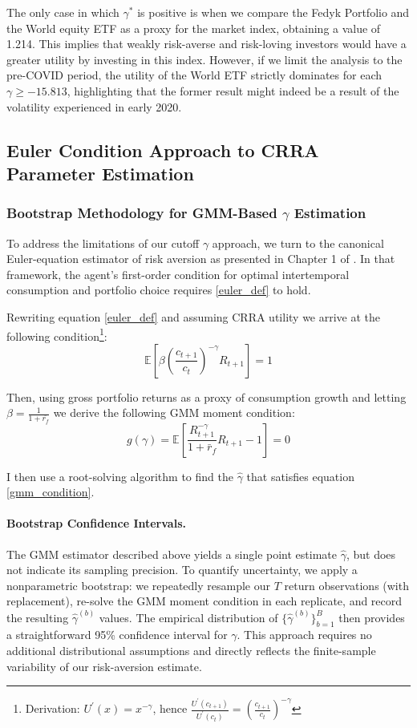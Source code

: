 The only case in which $\gamma^*$ is positive is when we compare the Fedyk Portfolio and the World equity ETF as a proxy for the market index, obtaining a value of 1.214.
This implies that weakly risk-averse and risk-loving investors would have a greater utility by investing in this index.
However, if we limit the analysis to the pre-COVID period, the utility of the World ETF strictly dominates for each $\gamma\geq-15.813$, 
highlighting that the former result might indeed be a result of the volatility experienced in early 2020.  

\subsection{Euler Condition Approach to CRRA Parameter Estimation}
\subsubsection{Bootstrap Methodology for GMM-Based $\gamma$ Estimation}
To address the limitations of our cutoff $\gamma$ approach, we turn to the canonical Euler-equation estimator of risk aversion as presented in Chapter 1 of \cite{Cochrane2005}.  
In that framework, the agent's first-order condition for optimal intertemporal consumption and portfolio choice requires \ref{euler_def} to hold.

Rewriting equation \ref{euler_def} and assuming CRRA utility we arrive at the following condition\footnote{Derivation:
$U^\prime(x)=x^{-\gamma}$, hence $\frac{U^\prime(c_{t+1})}{U^\prime(c_{t})}=\left(\frac{c_{t+1}}{c_t}\right)^{-\gamma}$}:
\begin{equation}
    \mathbb{E}\left[ \beta \left( \frac{c_{t+1}}{c_{t}} \right)^{-\gamma} R_{t+1} \right] = 1
\end{equation}  

Then, using gross portfolio returns as a proxy of consumption growth and letting $\beta = \frac{1}{1+\bar{r_f}}$ we derive the following GMM moment condition:
\begin{equation}
    g(\gamma) = \mathbb{E} \left[ \frac{R_{t+1}^{-\gamma}}{1+\bar{r}_f}  R_{t+1} - 1\right] = 0
    \label{gmm_condition}
\end{equation}  

I then use a root-solving algorithm to find the $\hat\gamma$ that satisfies equation \ref{gmm_condition}. 

\paragraph{Bootstrap Confidence Intervals.}
The GMM estimator described above yields a single point estimate $\hat\gamma$, but does not indicate its sampling precision.  
To quantify uncertainty, we apply a nonparametric bootstrap: we repeatedly resample our $T$ return observations (with replacement), re-solve the GMM moment condition in each replicate, and record the resulting $\hat\gamma^{(b)}$ values.  
The empirical distribution of $\{\hat\gamma^{(b)}\}_{b=1}^B$ then provides a straightforward 95\% confidence interval for $\gamma$.  
This approach requires no additional distributional assumptions and directly reflects the finite-sample variability of our risk-aversion estimate.

